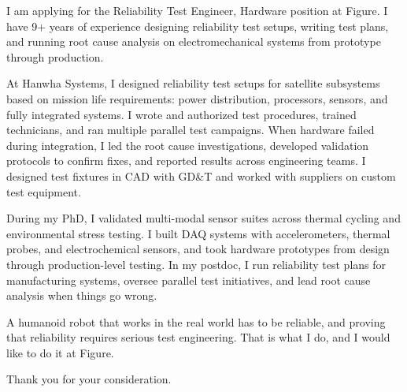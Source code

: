 \documentclass[letterpaper,11pt]{moderncv}
\date{\today}
\begin{document}
\makelettertitle

I am applying for the Reliability Test Engineer, Hardware position at Figure. I have 9+ years of experience designing reliability test setups, writing test plans, and running root cause analysis on electromechanical systems from prototype through production.

At Hanwha Systems, I designed reliability test setups for satellite subsystems based on mission life requirements: power distribution, processors, sensors, and fully integrated systems. I wrote and authorized test procedures, trained technicians, and ran multiple parallel test campaigns. When hardware failed during integration, I led the root cause investigations, developed validation protocols to confirm fixes, and reported results across engineering teams. I designed test fixtures in CAD with GD\&T and worked with suppliers on custom test equipment.

During my PhD, I validated multi-modal sensor suites across thermal cycling and environmental stress testing. I built DAQ systems with accelerometers, thermal probes, and electrochemical sensors, and took hardware prototypes from design through production-level testing. In my postdoc, I run reliability test plans for manufacturing systems, oversee parallel test initiatives, and lead root cause analysis when things go wrong.

A humanoid robot that works in the real world has to be reliable, and proving that reliability requires serious test engineering. That is what I do, and I would like to do it at Figure.

Thank you for your consideration.

\makeletterclosing
\end{document}
